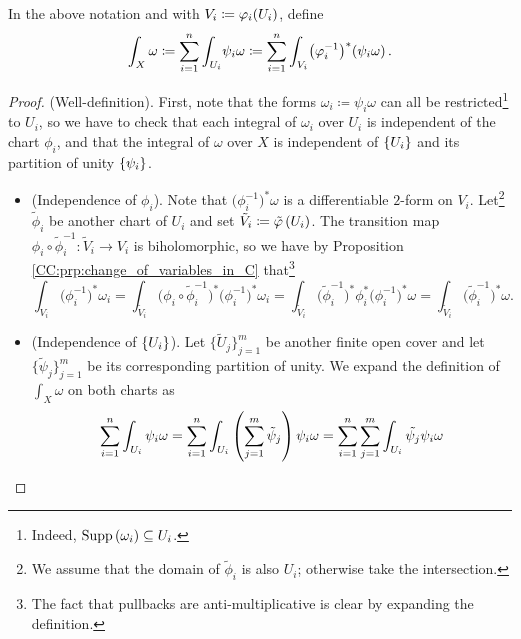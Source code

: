 \documentclass[../Moduli_Spaces_of_Riemann_Surfaces.tex]{subfiles}
\begin{document}
    \begin{defprop}
        In the above notation and with $V_i\coloneqq\varphi_i\!\left(U_i\right)$, define
        \begin{equation*}
            \int_X\omega\coloneqq\sum_{i=1}^{n}\int_{U_i}\!\psi_i\omega\coloneqq\sum_{i=1}^{n}\int_{V_i}\!\big(\varphi_i^{-1}\big)^\ast\!\left(\psi_i\omega\right).
        \end{equation*}
    \end{defprop}
    \begin{proof}
        (Well-definition). First, note that the forms $\omega_i\coloneqq\psi_i\omega$ can all be restricted\footnote{Indeed, $\operatorname{Supp}\left(\omega_i\right)\subseteq U_i$.} to $U_i$, so we have to check that each integral of $\omega_i$ over $U_i$ is independent of the chart $\phi_i$, and that the integral of $\omega$ over $X$ is independent of $\left\{U_i\right\}$ and its partition of unity $\left\{\psi_i\right\}$.
        \begin{itemize}
            \item (Independence of $\phi_i$). Note that $\big(\phi_i^{-1}\big)^\ast\omega$ is a differentiable $2$-form on $V_i$. Let\footnote{We assume that the domain of $\tilde{\phi}_i$ is also $U_i$; otherwise take the intersection.} $\tilde{\phi}_i$ be another chart of $U_i$ and set $\tilde{V}_i\coloneqq\tilde{\varphi}\left(U_i\right)$. The transition map $\phi_i\circ\tilde{\phi}_i^{-1}:\tilde{V}_i\to V_i$ is biholomorphic, so we have by Proposition \ref{CC:prp:change_of_variables_in_C} that\footnote{The fact that pullbacks are anti-multiplicative is clear by expanding the definition.}
                \begin{equation*}
                    \int_{V_i}\!\big(\phi_i^{-1}\big)^\ast\omega_i=\int_{\tilde{V}_i}\!\big(\phi_i\circ\tilde{\phi}_i^{-1}\big)^\ast\big(\phi_i^{-1}\big)^\ast\omega_i=\int_{\tilde{V}_i}\!\big(\tilde{\phi}_i^{-1}\big)^\ast\phi_i^\ast\big(\phi_i^{-1}\big)^\ast\omega=\int_{\tilde{V}_i}\!\big(\tilde{\phi}_i^{-1}\big)^\ast\omega.
                \end{equation*}
            \item (Independence of $\left\{U_i\right\}$). Let $\big\{\tilde{U}_j\big\}_{j=1}^m$ be another finite open cover and let $\big\{\tilde{\psi}_j\big\}_{j=1}^m$ be its corresponding partition of unity. We expand the definition of $\int_X\omega$ on both charts as
                \begin{equation*}
                    \begin{gathered}
                        \sum_{i=1}^{n}\int_{U_i}\psi_i\omega=\sum_{i=1}^{n}\int_{U_i}\l(\sum_{j=1}^{m}\tilde{\psi}_j\r)\psi_i\omega=\sum_{i=1}^{n}\sum_{j=1}^{m}\int_{U_i}\tilde{\psi_j}\psi_i\omega \\

\end{gathered}
\end{equation*}
\end{itemize}
\end{proof}
\end{document}
